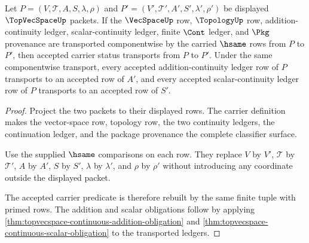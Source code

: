 \begin{theorem}
\label{thm:topvecspace-classifier-transport}
Let $P=(V,\mathcal T,A,S,\lambda,\rho)$ and $P'=(V',\mathcal T',A',S',\lambda',\rho')$ be displayed $\TopVecSpaceUp$ packets. If the $\VecSpaceUp$ row, $\TopologyUp$ row, addition-continuity ledger, scalar-continuity ledger, finite $\Cont$ ledger, and $\Pkg$ provenance are transported componentwise by the carried $\hsame$ rows from $P$ to $P'$, then accepted carrier status transports from $P$ to $P'$. Under the same componentwise transport, every accepted addition-continuity ledger row of $P$ transports to an accepted row of $A'$, and every accepted scalar-continuity ledger row of $P$ transports to an accepted row of $S'$.
\end{theorem}
\begin{proof}
Project the two packets to their displayed rows. The carrier definition makes the vector-space row, topology row, the two continuity ledgers, the continuation ledger, and the package provenance the complete classifier surface.

Use the supplied $\hsame$ comparisons on each row. They replace $V$ by $V'$, $\mathcal T$ by $\mathcal T'$, $A$ by $A'$, $S$ by $S'$, $\lambda$ by $\lambda'$, and $\rho$ by $\rho'$ without introducing any coordinate outside the displayed packet.

The accepted carrier predicate is therefore rebuilt by the same finite tuple with primed rows. The addition and scalar obligations follow by applying \autoref{thm:topvecspace-continuous-addition-obligation} and \autoref{thm:topvecspace-continuous-scalar-obligation} to the transported ledgers.
\end{proof}


